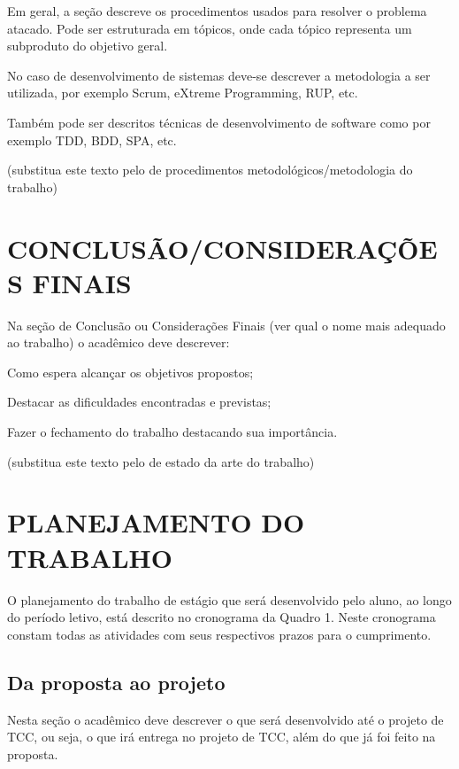 Em geral, a seção descreve os procedimentos usados para resolver o problema atacado. Pode ser estruturada em tópicos, onde cada tópico representa um subproduto do objetivo geral.

No caso de desenvolvimento de sistemas deve-se descrever a metodologia a ser utilizada, por exemplo Scrum, eXtreme Programming, RUP, etc. 

Também pode ser descritos técnicas de desenvolvimento de software como por exemplo TDD, BDD, SPA,  etc.

(substitua este texto pelo de procedimentos metodológicos/metodologia do trabalho)

\section{CONCLUSÃO/CONSIDERAÇÕES FINAIS} %
\label{sec:conclusao}
Na seção de Conclusão ou Considerações Finais (ver qual o nome mais adequado ao trabalho) o acadêmico deve descrever:

Como espera alcançar os objetivos propostos;

Destacar as dificuldades encontradas e previstas;

Fazer o fechamento do trabalho destacando sua importância.

(substitua este texto pelo de estado da arte do trabalho)

\section{PLANEJAMENTO DO TRABALHO}
\label{sec:planejamento}
O planejamento do trabalho de estágio que será desenvolvido pelo aluno, ao longo do período letivo, está descrito no cronograma da Quadro 1. Neste cronograma constam todas as atividades com seus respectivos prazos para o cumprimento.


\subsection{Da proposta ao projeto}
Nesta seção o acadêmico deve descrever o que será desenvolvido até o projeto de TCC, ou seja,
o que irá entrega no projeto de TCC, além do que já foi feito na proposta.

